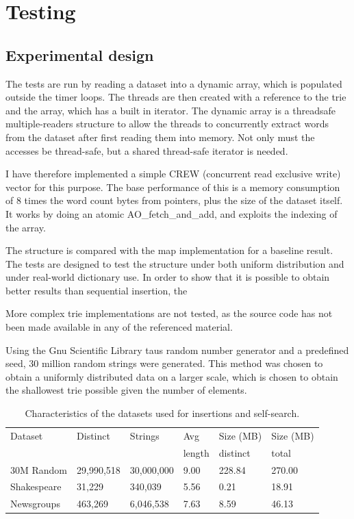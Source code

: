 \chapter{Testing}

\section{Experimental design}
The tests are run by reading a dataset into a dynamic array, which is populated
outside the timer loops. The threads are then created with a reference to the
trie and the array, which has a built in iterator. 
The dynamic array is a threadsafe multiple-readers structure to
allow the threads to concurrently extract words from the dataset after first
reading them into memory. Not only must the accesses be thread-safe, but
a shared thread-safe iterator is needed.

I have therefore implemented a simple CREW (concurrent read exclusive write)
vector for this purpose. The base performance of this is a memory consumption
of 8 times the word count bytes from pointers, plus the size of the dataset
itself. It works by doing an atomic {\keyword AO\_fetch\_and\_add}, and
exploits the indexing of the array.

The structure is compared with the \STL map implementation for a baseline result.
The tests are designed to test the structure under both uniform distribution and
under real-world dictionary use. In order to show that it is possible to obtain
better results than sequential insertion, the

More complex trie implementations are not tested, as the source code has not
been made available in any of the referenced material.

Using the Gnu Scientific Library taus random number generator and a predefined
seed, 30 million random strings were generated. This method was chosen to
obtain a uniformly distributed data on a larger scale, which is chosen to
obtain the shallowest trie possible given the number of elements.

\begin{table}[h!]
    \centering
    \begin{tabular}[here]{l l l l l l}
        \hline
        Dataset    & Distinct   & Strings      & Avg     & Size (MB)& Size (MB)\\
                   &            &              & length  & distinct & total    \\\hline
        30M Random & 29,990,518 & 30,000,000   & 9.00    & 228.84   & 270.00\\
        Shakespeare&  31,229    & 340,039      & 5.56    & 0.21     & 18.91\\
        Newsgroups & 463,269    & 6,046,538    & 7.63    & 8.59     & 46.13\\
        \hline
    \end{tabular}
    \caption{Characteristics of the datasets used for insertions and self-search.}
    \label{tab:datasets}
\end{table}

